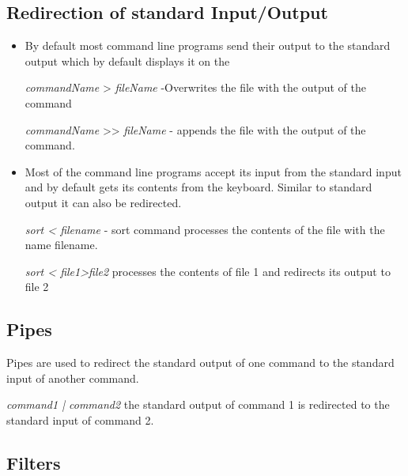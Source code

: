 \documentclass{article}
\begin{document}
\subsection{Redirection of standard Input/Output}
\begin{itemize}
\item By default most command line programs send their output to the standard output which by default displays it on the 

\hspace{10mm} \textit{commandName} > \textit{fileName} -Overwrites the file with the output of the command

\hspace{10mm} \textit{commandName} >> \textit{fileName} - appends the file with the output of the command.

\item Most of the command line programs accept its input from the standard input and by default gets its contents from the keyboard. Similar to standard output it can also be redirected.

\textit{sort < filename} - sort command processes the contents of the file with the name filename.

\hspace{10mm} \textit{sort < file1>file2} processes the contents of file 1 and redirects its output to file 2

\end{itemize}

\subsection{Pipes}
Pipes are used to redirect the standard output of one command to the standard input of another command.

\hspace{10mm} \textit{command1 | command2} the standard output of command 1 is redirected to the standard input of command 2.

\subsection{Filters}
\end{document}

